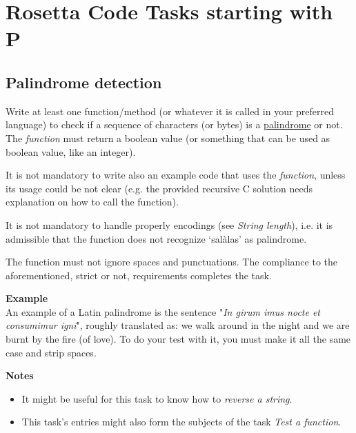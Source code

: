 %
%
%

\chapter{Rosetta Code Tasks starting with P}

\section*{Palindrome detection}

Write at least one function/method (or whatever it is called in your
preferred language) to check if a sequence of characters (or bytes) is a
\href{http://en.wikipedia.org/wiki/Palindrome}{palindrome} or not. The
\emph{function} must return a boolean value (or something that can be
used as boolean value, like an integer).

It is not mandatory to write also an example code that uses the
\emph{function}, unless its usage could be not clear (e.g. the provided
recursive C solution needs explanation on how to call the function).

It is not mandatory to handle properly encodings (see
\emph{String length}), i.e. it is admissible that
the function does not recognize `salàlas' as palindrome.

The function must not ignore spaces and punctuations. The compliance to
the aforementioned, strict or not, requirements completes the task.

\textbf{Example}\\ An example of a Latin palindrome is the sentence
"\emph{In girum imus nocte et consumimur igni}", roughly translated as:
we walk around in the night and we are burnt by the fire (of love). To
do your test with it, you must make it all the same case and strip
spaces.

\textbf{Notes}\\

\begin{itemize}
\item
  It might be useful for this task to know how to
  \emph{reverse a string}.
\item
  This task's entries might also form the subjects of the task
  \emph{Test a function}.
\end{itemize}


